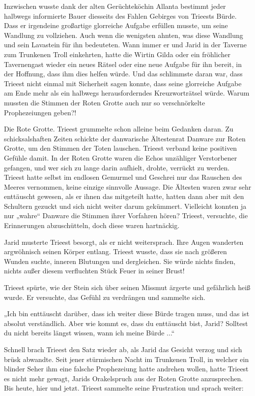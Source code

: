Inzwischen wusste dank der alten Gerüchteköchin Allanta bestimmt jeder halbwegs informierte Bauer diesseits des Fahlen Gebirges von Trieests Bürde. Dass er irgendeine großartige glorreiche Aufgabe erfüllen musste, um seine Wandlung zu vollziehen. Auch wenn die wenigsten ahnten, was diese Wandlung und sein Lavastein für ihn bedeuteten. Wann immer er und Jarid in der Taverne zum Trunkenen Troll einkehrten, hatte die Wirtin Gilda oder ein fröhlicher Tavernengast wieder ein neues Rätsel oder eine neue Aufgabe für ihn bereit, in der Hoffnung, dass ihm dies helfen würde. Und das schlimmste daran war, dass Trieest nicht einmal mit Sicherheit sagen konnte, dass seine glorreiche Aufgabe am Ende mehr als ein halbwegs herausforderndes Kreuzworträtsel würde. Warum mussten die Stimmen der Roten Grotte auch nur so verschnörkelte Prophezeiungen geben?!

Die Rote Grotte. Trieest grummelte schon alleine beim Gedanken daran. Zu schicksalshaften Zeiten schickte der danwarische Ältestenrat Danware zur Roten Grotte, um den Stimmen der Toten lauschen. Trieest verband keine positiven Gefühle damit. In der Roten Grotte waren die Echos unzähliger Verstorbener gefangen, und wer sich zu lange darin aufhielt, drohte, verrückt zu werden. Trieest hatte selbst im endlosen Gemurmel und Geschrei nur das Rauschen des Meeres vernommen, keine einzige sinnvolle Aussage. Die Ältesten waren zwar sehr enttäuscht gewesen, als er ihnen das mitgeteilt hatte, hatten dann aber mit den Schultern gezuckt und sich nicht weiter darum gekümmert. Vielleicht konnten ja nur „wahre“ Danware die Stimmen ihrer Vorfahren hören? Trieest, versuchte, die Erinnerungen abzuschütteln, doch diese waren hartnäckig.

Jarid musterte Trieest besorgt, als er nicht weitersprach. Ihre Augen wanderten argwöhnisch seinen Körper entlang. Trieest wusste, dass sie nach größeren Wunden suchte, inneren Blutungen und dergleichen. Sie würde nichts finden, nichts außer diesem verfluchten Stück Feuer in seiner Brust!

Trieest spürte, wie der Stein sich über seinen Missmut ärgerte und gefährlich heiß wurde. Er versuchte, das Gefühl zu verdrängen und sammelte sich.

„Ich bin enttäuscht darüber, dass ich weiter diese Bürde tragen muss, und das ist absolut verständlich. Aber wie kommt es, dass du enttäuscht bist, Jarid? Solltest du nicht bereits längst wissen, wann ich meine Bürde ...“

Schnell brach Trieest den Satz wieder ab, als Jarid das Gesicht verzog und sich brüsk abwandte. Seit jener stürmischen Nacht im Trunkenen Troll, in welcher ein blinder Seher ihm eine falsche Prophezeiung hatte andrehen wollen, hatte Trieest es nicht mehr gewagt, Jarids Orakelspruch aus der Roten Grotte anzusprechen. Bis heute, hier und jetzt. Trieest sammelte seine Frustration und sprach weiter:

